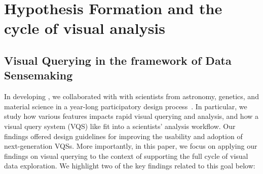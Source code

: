 \section{Hypothesis Formation and the cycle of visual analysis\label{sec:hypothesis}}
\subsection{Visual Querying in the framework of Data Sensemaking}
In developing \zv, we collaborated with with scientists from astronomy, genetics, and material science in a year-long participatory design process~\cite{Lee2017}. In particular, we study how various features impacts rapid visual querying and analysis, and how a visual query system (VQS) like \zv fit into a scientists’ analysis workflow. Our findings offered design guidelines for improving the usability and adoption of next-generation VQSs. More importantly, in this paper, we focus on applying our findings on visual querying to the context of supporting the full cycle of visual data exploration. We highlight two of the key findings related to this goal below: 

